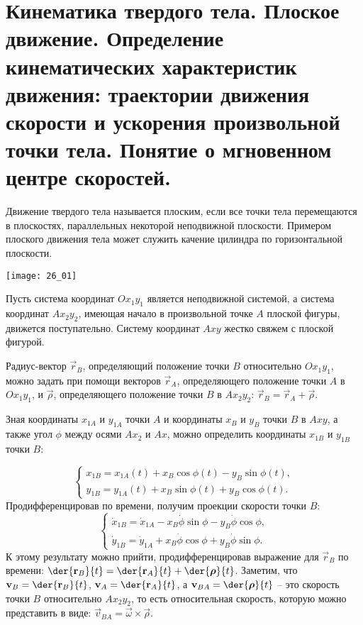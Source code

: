 \chapter{Кинематика твердого тела. Плоское движение. Определение кинематических
характеристик движения: траектории движения скорости и ускорения
произвольной точки тела. Понятие о мгновенном центре скоростей.}

Движение твердого тела называется плоским, если все точки тела перемещаются в
плоскостях, параллельных некоторой неподвижной плоскости. Примером плоского
движения тела может служить качение цилиндра по горизонтальной плоскости.

\begin{minipage}{.4\textwidth}
    \texttt{[image: 26\_01]}
\end{minipage}
\begin{minipage}{.55\textwidth}
Пусть система координат \( Ox_1y_1 \) является неподвижной системой, а система
координат \( Ax_2y_2 \), имеющая начало в произвольной точке \( A \) плоской
фигуры, движется поступательно. Систему координат \( Axy \) жестко свяжем с
плоской фигурой.

Радиус-вектор \( \vec{r}_B \), определяющий положение точки \( B \) относительно
\( Ox_1y_1 \), можно задать при помощи векторов \( \vec{r}_A \), определяющего
положение точки \( A \) в \( Ox_1y_1 \), и \( \vec{\rho} \), определяющего
положение точки \( B \) в \( Ax_2y_2 \): \(\vec{r}_B = \vec{r}_A + \vec{\rho}\).

Зная координаты \( x_{1A} \) и \( y_{1A} \) точки \( A \) и координаты \( x_B \)
и \( y_B \) точки \( B \) в \( Axy \), а также угол \( \phi \) между осями
\( Ax_2 \) и \( Ax \), можно определить координаты \( x_{1B} \) и \( y_{1B} \)
точки \( B \):
\end{minipage}
\[
    \left\{ \begin{array}{l}
        x_{1B} = x_{1A}(t) + x_B\cos\phi(t) - y_B\sin\phi(t), \\
        y_{1B} = y_{1A}(t) + x_B\sin\phi(t) + y_B\cos\phi(t).
    \end{array} \right.
\]
Продифференцировав по времени, получим проекции скорости точки \( B \):
\[
    \left\{ \begin{array}{l}
        \dot{x}_{1B} = \dot{x}_{1A} - x_B\dot{\phi}\sin\phi -
        y_B\dot{\phi}\cos\phi, \\
        \dot{y}_{1B} = \dot{y}_{1A} + x_B\dot{\phi}\cos\phi +
        y_B\dot{\phi}\sin\phi.
    \end{array} \right.
\]
К этому результату можно прийти, продифференцировав выражение для
\( \vec{r}_B \) по времени: \( \ds \der{\vec{r}_B}{t} = \der{\vec{r}_A}{t} +
\der{\vec{\rho}}{t} \). Заметим, что \( \ds \vec{v}_B = \der{\vec{r}_B}{t} \),
\( \ds \vec{v}_A = \der{\vec{r}_A}{t} \), а \( \ds \vec{v}_{BA} =
\der{\vec{\rho}}{t} \) -- это скорость точки \( B \) относительно \( Ax_2y_2 \),
то есть относительная скорость, которую можно представить в виде:
\( \vec{v}_{BA} = \vec{\omega}\times\vec{\rho} \).

